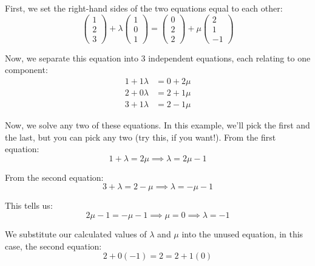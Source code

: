 \documentclass[
	11pt, %
	fleqn, %
	a4paper, %
]{../../styles/LegrandOrangeBook}
\begin{document}
\begin{solution}
	First, we set the right-hand sides of the two equations equal to each other:
	\begin{equation*}
		\begin{pmatrix}
			1 \\ 2 \\ 3
		\end{pmatrix} + \lambda \begin{pmatrix}
			1 \\ 0 \\ 1
		\end{pmatrix} = \begin{pmatrix}
			0 \\ 2 \\ 2
		\end{pmatrix} + \mu \begin{pmatrix}
			2 \\ 1 \\ -1
		\end{pmatrix} 
	\end{equation*}
	
	Now, we separate this equation into 3 independent equations, each relating to one component:
	\begin{align*}
		1 + 1\lambda &= 0 + 2\mu \\
		2 + 0\lambda &= 2 + 1\mu \\
		3 + 1\lambda &= 2 - 1\mu
	\end{align*}
	
	Now, we solve any two of these equations. In this example, we'll pick the first and the last, but you can pick any two (try this, if you want!). From the first equation:
	\begin{equation*}
		1 + \lambda = 2\mu \implies \lambda = 2\mu - 1
	\end{equation*}
	
	From the second equation:
	\begin{equation*}
		3 + \lambda = 2 - \mu \implies \lambda = - \mu -1 
	\end{equation*}
	
	This tells us:
	\begin{equation*}
		2\mu - 1 = -\mu - 1 \implies \mu = 0 \implies \lambda = -1
	\end{equation*}
	
	We substitute our calculated values of $\lambda$ and $\mu$ into the unused equation, in this case, the second equation:
	\begin{equation*}
		2 + 0(-1) = 2 = 2 + 1(0)
	\end{equation*}
	

\end{solution}
\end{document}
